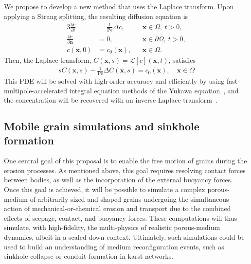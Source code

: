\documentclass[11pt]{article}
\newcommand{\pd}[2]{ \frac{ \partial #1}{ \partial #2 } }
\newcommand{\bvec}[1]{{\mathbf{#1}}}
\newcommand{\Pe}{\mathrm{Pe}}
\newcommand{\xx}{\bvec{x}}
\newcommand{\nn}{{\mathbf{n}}}
\begin{document}
We propose to develop a new method that uses the Laplace transform.
Upon applying a Strang splitting, the resulting diffusion equation is
\begin{alignat}{3}
  \pd{c}{t} &= \frac{1}{\Pe} \Delta c, \quad &&\xx \in \Omega, \: t>0, \\
  \pd{c}{\nn} &= 0, &&\xx \in \partial\Omega, \: t>0, \\
  c(\xx,0) &= c_0(\xx), &&\xx \in \Omega.
\end{alignat}
Then, the Laplace transform, $C(\xx,s) = \mathcal{L}[c](\xx,t)$,
satisfies
\begin{align}
  sC(\xx,s) - \frac{1}{\Pe}\Delta C(\xx,s) = c_0(\xx), 
    \quad \xx \in \Omega
\end{align}
This PDE will be solved with high-order accuracy and efficiently by
using fast-multipole-accelerated integral equation methods of the Yukawa
equation~\cite{kro-qua2011}, and the concentration will be recovered
with an inverse Laplace transform~\cite{jos-war2006}.





\subsection{Mobile grain simulations and sinkhole formation}


One central goal of this proposal is to enable the free motion of grains during the erosion processes. As mentioned above, this goal requires resolving contact forces between bodies, as well as the incorporation of the external buoyancy forces. Once this goal is achieved, it will be possible to simulate a complex porous-medium of arbitrarily sized and shaped grains undergoing the simultaneous action of mechanical-or-chemical erosion and transport due to the combined effects of seepage, contact, and buoyancy forces. These computations will thus simulate, with high-fidelity, the multi-physics of realistic porous-medium dynamics, albeit in a scaled down context. Ultimately, such simulations could be used to build an understanding of medium reconfiguration events, such as sinkhole collapse or conduit formation in karst networks.
\end{document}
